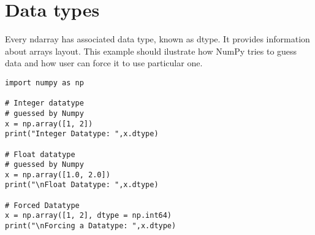 \documentclass{article}
\begin{document}
\section{Data types}
Every ndarray has associated data type, known as dtype.
It provides information about arrays layout.
This example should ilustrate how NumPy tries to guess data 
and how user can force it to use particular one.
\begin{lstlisting}
import numpy as np
 
# Integer datatype
# guessed by Numpy
x = np.array([1, 2])
print("Integer Datatype: ",x.dtype)

# Float datatype
# guessed by Numpy
x = np.array([1.0, 2.0])
print("\nFloat Datatype: ",x.dtype)

# Forced Datatype
x = np.array([1, 2], dtype = np.int64)
print("\nForcing a Datatype: ",x.dtype)
\end{lstlisting}
\end{document}
